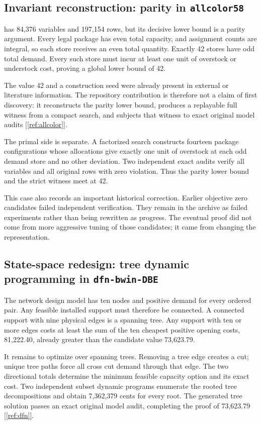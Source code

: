 \documentclass[11pt,letterpaper]{article}
\newcommand{\sourcecite}[1]{\hyperref[#1]{[\ref*{#1}]}}
\begin{document}
\subsection{Invariant reconstruction: parity in \texttt{allcolor58}}

\texttt{} has 84,376 variables and 197,154 rows, but its decisive lower bound is a parity argument. Every legal package has even total capacity, and assignment counts are integral, so each store receives an even total quantity. Exactly 42 stores have odd total demand. Every such store must incur at least one unit of overstock or understock cost, proving a global lower bound of 42.

The value 42 and a construction seed were already present in external or literature information. The repository contribution is therefore not a claim of first discovery: it reconstructs the parity lower bound, produces a replayable full witness from a compact search, and subjects that witness to exact original model audits \sourcecite{ref:allcolor}.

The primal side is separate. A factorized search constructs fourteen package configurations whose allocations give exactly one unit of overstock at each odd demand store and no other deviation. Two independent exact audits verify all variables and all original rows with zero violation. Thus the parity lower bound and the strict witness meet at 42.

This case also records an important historical correction. Earlier objective zero candidates failed independent verification. They remain in the archive as failed experiments rather than being rewritten as progress. The eventual proof did not come from more aggressive tuning of those candidates; it came from changing the representation.

\subsection{State-space redesign: tree dynamic programming in \texttt{dfn-bwin-DBE}}

The network design model has ten nodes and positive demand for every ordered pair. Any feasible installed support must therefore be connected. A connected support with nine physical edges is a spanning tree. Any support with ten or more edges costs at least the sum of the ten cheapest positive opening costs, 81,222.40, already greater than the candidate value 73,623.79.

It remains to optimize over spanning trees. Removing a tree edge creates a cut; unique tree paths force all cross cut demand through that edge. The two directional totals determine the minimum feasible capacity option and its exact cost. Two independent subset dynamic programs enumerate the rooted tree decompositions and obtain 7,362,379 cents for every root. The generated tree solution passes an exact original model audit, completing the proof of 73,623.79 \sourcecite{ref:dfn}.
\end{document}
